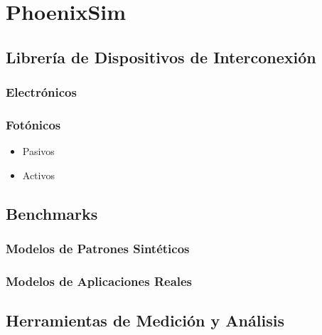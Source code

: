 \section{PhoenixSim}

\subsection{Librería de Dispositivos de Interconexión}
\subsubsection{Electrónicos}
\subsubsection{Fotónicos}
\begin{itemize}
\item Pasivos
\end{itemize}

\begin{itemize}
\item Activos
\end{itemize}  

\subsection{Benchmarks}
\subsubsection{Modelos de Patrones Sintéticos}
\subsubsection{Modelos de Aplicaciones Reales}

\subsection{Herramientas de Medición y Análisis}

